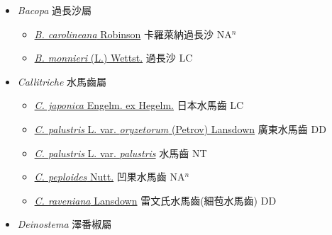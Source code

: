 
  \begin{itemize}
 \item[] \textit{Bacopa} 過長沙屬
                    
  \begin{itemize}
        \item[] \href{http://www.theplantlist.org/tpl1.1/search?q=Bacopa+carolineana}{\textit{B. carolineana} Robinson}   卡羅萊納過長沙 NA$^n$
        \item[] \href{http://www.theplantlist.org/tpl1.1/search?q=Bacopa+monnieri}{\textit{B. monnieri} (L.) Wettst.}   過長沙 LC
  \end{itemize}
 \item[] \textit{Callitriche} 水馬齒屬
                    
  \begin{itemize}
        \item[] \href{http://www.theplantlist.org/tpl1.1/search?q=Callitriche+japonica}{\textit{C. japonica} Engelm. ex Hegelm.}   日本水馬齒 LC
        \item[] \href{http://www.theplantlist.org/tpl1.1/search?q=Callitriche+palustris+var.+oryzetorum}{\textit{C. palustris} L. var. \textit{oryzetorum} (Petrov) Lansdown}   廣東水馬齒 DD
        \item[] \href{http://www.theplantlist.org/tpl1.1/search?q=Callitriche+palustris+var.+palustris}{\textit{C. palustris} L. var. \textit{palustris}}     水馬齒 NT
        \item[] \href{http://www.theplantlist.org/tpl1.1/search?q=Callitriche+peploides}{\textit{C. peploides} Nutt.}   凹果水馬齒 NA$^n$
        \item[] \href{http://www.theplantlist.org/tpl1.1/search?q=Callitriche+raveniana}{\textit{C. raveniana} Lansdown}   雷文氏水馬齒(細苞水馬齒) DD
  \end{itemize}
 \item[] \textit{Deinostema} 澤番椒屬
                    

\end{itemize}
